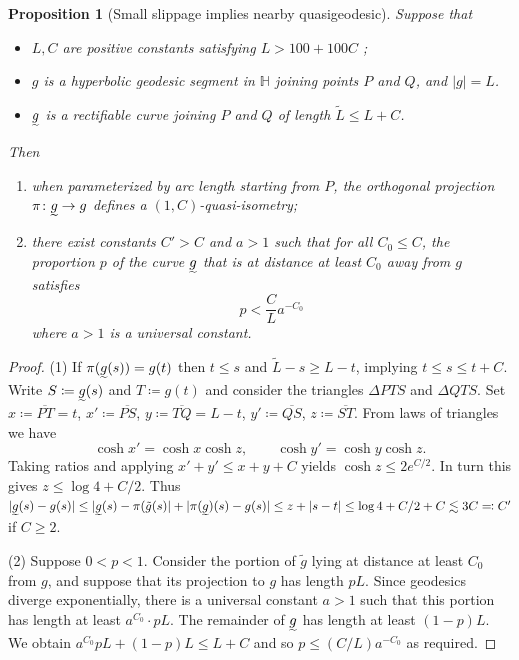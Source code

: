 \documentclass{amsart}
\newcommand\IH{{\mathbb{H}}}
\newtheorem{prop}[thm]{Proposition}
\theoremstyle{definition}
\theoremstyle{remark}
\begin{document}
\begin{prop}[Small slippage implies nearby quasigeodesic]\label{prop:slippage} 
Suppose that
\begin{itemize}
\item $L, C$ are positive constants satisfying $L>100+100C$ ;
\item $g$ is a hyperbolic geodesic segment in $\IH$ joining points $P$ and $Q$, and $|g|=L$. \item  $\undertilde{g}$ is a rectifiable curve joining $P$ and $Q$ of length $\tilde{L} \leq L+C$.
\end{itemize}
Then
\begin{enumerate}
\item when parameterized by arc length starting from $P$, the orthogonal projection $\pi\colon \undertilde{g}\to g$ defines a $(1, C)$-quasi-isometry;
\item there exist constants $C'>C$ and $a>1$ such that for all $C_0 \leq C$, the proportion $p$ of the curve $\undertilde{g}$ that is at distance at least $C_0$ away from $g$ satisfies
\[ p < \frac{C}{L}a^{-C_0}\]
where $a>1$ is a universal constant. 
\end{enumerate}
\end{prop}

\begin{proof} (1) If $\pi(\undertilde{g}(s))=g(t)$ then $t \leq s$ and $\tilde{L}-s \geq L-t$, implying $t \leq s \leq t+C$. Write $S\coloneqq\undertilde{g}(s)$ and $T\coloneqq g(t)$ and consider the triangles $\Delta PTS$ and $\Delta QTS$. Set $x\coloneqq\overline{PT}=t$, $x'\coloneqq\overline{PS}$, $y\coloneqq\overline{TQ}=L-t$, $y'\coloneqq\overline{QS}$, $z\coloneqq\overline{ST}$. From laws of triangles we have 
\[ \cosh x' = \cosh x \cosh z,\qquad\cosh y' = \cosh y \cosh z.\]
Taking ratios and applying $x'+y'\leq x+y+C$ yields $\cosh z \leq 2e^{C/2}$. In turn this gives $z \leq \log 4 + C/2$. Thus $|\undertilde{g}(s)-g(s)| \leq |\undertilde{g}(s)-\pi(\tilde{g}(s)| + |\pi(\undertilde{g})(s)-g(s)| \leq z+|s-t|\leq \log 4 +C/2 + C \lesssim 3C\eqqcolon C'$ if $C\geq 2$. 

(2) Suppose $0<p<1$.  Consider the portion of $\tilde{g}$ lying at distance at least $C_0$ from $g$, and suppose that its projection to $g$ has length $pL$. Since geodesics diverge exponentially, there is a universal constant $a>1$ such that this portion has length at least $a^{C_0}\cdot pL$. The remainder of $\undertilde{g}$  has length at least $(1-p)L$. We obtain $a^{C_0}pL + (1-p)L \leq L+C$ 
and so $p \leq (C/L)a^{-C_0}$ as required.
\end{proof}
\end{document}

